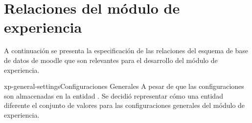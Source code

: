 
\section{Relaciones del módulo de experiencia}

 A continuación se presenta la especificación de las relaciones del esquema de base
 de datos de moodle que son relevantes para el desarrollo del módulo de experiencia.

    \begin{cdtEntidad}{xp-general-settings}{Configuraciones Generales}{
    A pesar de que las configuraciones son almacenadas en la entidad .
    Se decidió representar cómo una entidad diferente el conjunto de valores para las configuraciones
    generales del módulo de experiencia.}


    \end{cdtEntidad}

